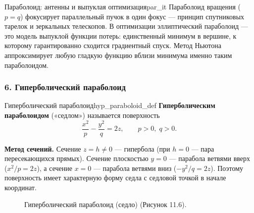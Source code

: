 \documentclass[12pt,a4paper]{article}
\begin{document}
\begin{remarkIT}{Параболоид: антенны и выпуклая оптимизация}{par_it}
  Параболоид вращения ($p = q$) фокусирует параллельный пучок в один
  фокус — принцип спутниковых тарелок и зеркальных телескопов. В
  оптимизации эллиптический параболоид — это модель выпуклой функции
  потерь: единственный минимум в вершине, к которому гарантированно
  сходится градиентный спуск. Метод Ньютона аппроксимирует любую
  гладкую функцию вблизи минимума именно таким параболоидом.
\end{remarkIT}

\subsubsection*{6. Гиперболический параболоид}

\begin{definition}{Гиперболический параболоид}{hyp_paraboloid_def}
  \textbf{Гиперболическим параболоидом} («седлом») называется
  поверхность
  \begin{equation}
    \frac{x^2}{p} - \frac{y^2}{q} = 2z, \qquad p > 0,\; q > 0. \tag{11.9}
  \end{equation}

  \textbf{Метод сечений.} Сечение $z = h \ne 0$ — гипербола (при
  $h = 0$ — пара пересекающихся прямых). Сечение плоскостью $y = 0$ —
  парабола ветвями вверх ($x^2/p = 2z$), а сечение $x = 0$ — парабола
  ветвями вниз ($-y^2/q = 2z$). Поэтому поверхность имеет характерную
  форму седла с седловой точкой в начале координат.
\end{definition}

\begin{figure}[h!]
  \centering
  \caption{Гиперболический параболоид (седло) (Рисунок 11.6).}
  \label{fig:hyp_paraboloid}
\end{figure}
\end{document}
